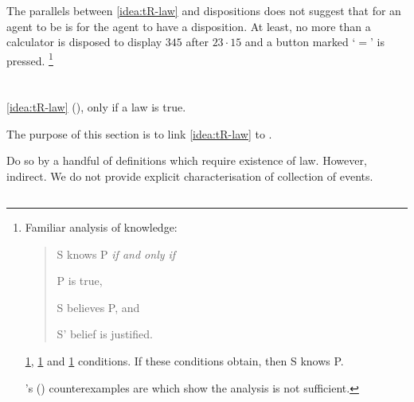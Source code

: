 \begin{note}
  The parallels between \autoref{idea:tR-law} and dispositions does not suggest that for an agent to be \tCV{} is for the agent to have a disposition.
  At least, no more than a calculator is disposed to display \(345\) after \(23 \cdot 15\) and a button marked `\(=\)' is pressed.%
  \footnote{
    Familiar analysis of knowledge:

    \begin{quote}
      S knows P \emph{if and only if}
      \begin{enumerate*}[label=\roman*., ref=(\roman*)]
      \item
        \label{K:jtb:t}
        P is true,
      \item
        \label{K:jtb:b}
        S believes P, and
      \item
        \label{K:jtb:j}
        S' belief is justified.
      \end{enumerate*}%
    \end{quote}

    \ref{K:jtb:t}, \ref{K:jtb:b} and \ref{K:jtb:j} conditions.
    If these conditions obtain, then S knows P.

    \citeauthor{Gettier:1963aa}'s (\citeyear{Gettier:1963aa}) counterexamples are  which show the analysis is not sufficient.
  }
\end{note}


\section{}
\label{cha:typical:tCDef}

\begin{note}
  \autoref{idea:tR-law} (),  only if a law is true.

  The purpose of this section is to link \autoref{idea:tR-law} to .

  Do so by a handful of definitions which require existence of law.
  However, indirect.
  We do not provide explicit characterisation of collection of events.
\end{note}

\subsection{}
\label{cha:typical:tCDef:ToRdef}

